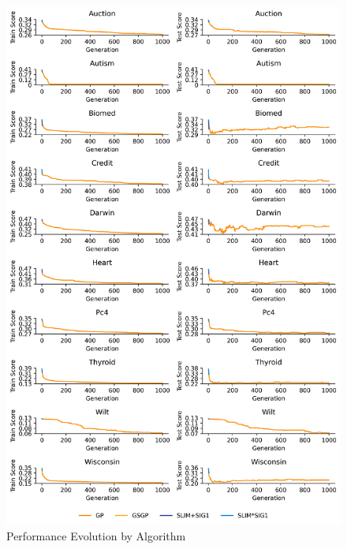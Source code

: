 
    \begin{figure}[H]
    \centering
    \includegraphics[width=\linewidth]{../Latex/Chapters/Figures/Results/final_comparison_performance_evolution.png}
    \caption{Performance Evolution by Algorithm}
    \label{fig:final_comparison_performance_evolution}
    \end{figure}
    